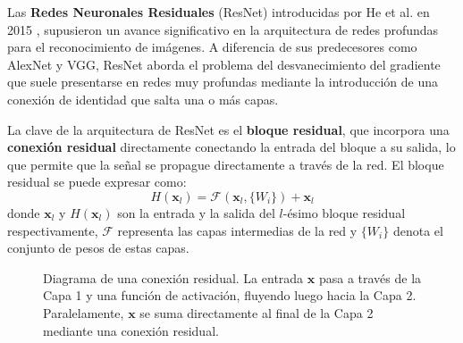 Las \textbf{Redes Neuronales Residuales} (ResNet) introducidas por He et al. en
2015 \cite{he2016deep}, supusieron un avance significativo en la arquitectura de
redes profundas para el reconocimiento de imágenes. A diferencia de sus
predecesores como AlexNet y VGG, ResNet aborda el problema del desvanecimiento del
gradiente que suele presentarse en redes muy profundas mediante la introducción de
una conexión de identidad que salta una o más capas.

La clave de la arquitectura de ResNet es el \textbf{bloque residual}, que incorpora
una \textbf{conexión residual} directamente conectando la entrada del bloque a
su salida, lo que permite que la señal se propague directamente a través de la red.
El bloque residual se puede expresar como:
\begin{equation}
	H(\mathbf{x}_{l}) = \mathcal{F}(\mathbf{x}_{l}, \{W_{i}\}) + \mathbf{x}_{l}
\end{equation}
donde $\mathbf{x}_{l}$ y $H(\mathbf{x}_{l})$ son la entrada y la salida del $l$-ésimo
bloque residual respectivamente, $\mathcal{F}$ representa las capas intermedias
de la red y $\{W_{i}\}$ denota el conjunto de pesos de estas capas.

\begin{figure}
	\centering
	\caption{Diagrama de una conexión residual. La entrada $\mathbf{x}$ pasa a través
		de la Capa 1 y una función de activación, fluyendo luego hacia la Capa 2.
		Paralelamente, $\mathbf{x}$ se suma directamente al final de la Capa 2 mediante
		una conexión residual. }
\end{figure}

